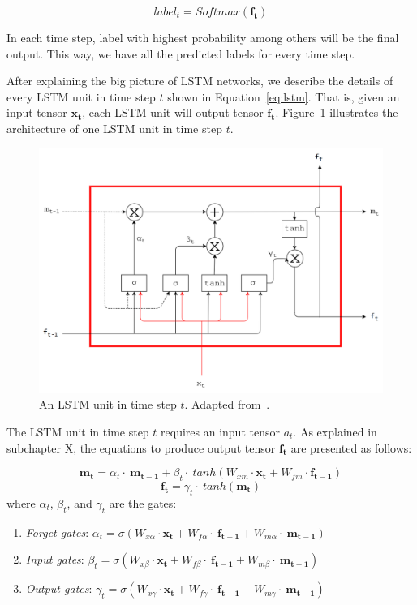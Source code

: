\begin{equation}
\label{eq:softmaxout}
label_{t} = Softmax(\mathbf{f_{t}})
\end{equation}

In each time step, label with highest probability among others will be the final output. This way, we have all the predicted labels for every time step.

After explaining the big picture of LSTM networks, we describe the details of every LSTM unit in time step $t$ shown in Equation~\ref{eq:lstm}. That is, given an input tensor $\mathbf{x_{t}}$, each LSTM unit will output tensor $\mathbf{f_{t}}$. Figure~\ref{fig:lstmunit} illustrates the architecture of one LSTM unit in time step $t$.

\begin{figure}
	\centering
	\includegraphics[width=0.85\linewidth]{images/lstmadapted2}
	\caption{An LSTM unit in time step $t$. Adapted from~\citep{skripsiwahid}.}
	\label{fig:lstmunit}
\end{figure}

The LSTM unit in time step $t$ requires an input tensor $a_{t}$. As explained in subchapter X, the equations to produce output tensor $\mathbf{f_{t}}$ are presented as follows:

\begin{equation}\label{eq:lstmm}
\mathbf{m_{t}}=\alpha_{t}\cdot~\mathbf{m_{t-1}} + \beta_{t}\cdot~tanh(W_{xm} \cdot \mathbf{x_{t}} + W_{fm} \cdot \mathbf{f_{t-1}})
\end{equation}
\begin{equation}\label{eq:lstmh}
\mathbf{f_{t}}=\gamma_{t}\cdot~tanh(\mathbf{m_{t}})
\end{equation}
where
$ \alpha_t $, $ \beta_t $, and $ \gamma_t $ are the gates:
\begin{enumerate}
	\item \textit{Forget gates}: $ \alpha_{t}=\sigma(W_{x\alpha} \cdot \mathbf{x_{t}}+W_{f\alpha}\cdot~\mathbf{f_{t-1}}+W_{m\alpha}\cdot~\mathbf{m_{t-1}}) $
	\item \textit{Input gates}: $ \beta_{t}=\sigma(W_{x\beta}\cdot \mathbf{x_{t}}+W_{f\beta}\cdot~\mathbf{f_{t-1}}+W_{m\beta}\cdot~\mathbf{m_{t-1}}) $
	\item \textit{Output gates}: $ \gamma_{t}=\sigma(W_{x\gamma}\cdot \mathbf{x_{t}}+W_{f\gamma}\cdot~\mathbf{f_{t-1}}+W_{m\gamma}\cdot~\mathbf{m_{t-1}}) $
\end{enumerate}

